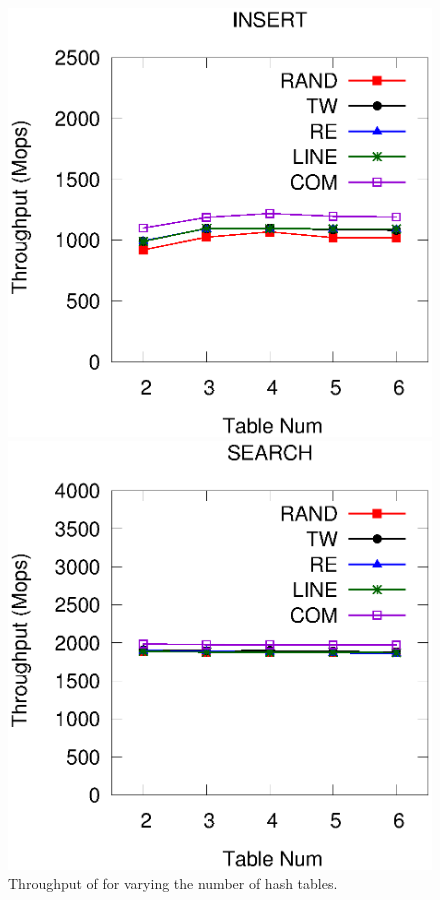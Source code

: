 \begin{figure}[t]
	\begin{minipage}{0.48\linewidth}\centering
		\includegraphics[width=\linewidth]{pic/tunning/tunning-insert.eps}
		\centerline{}
	\end{minipage}
	\hfill
	\begin{minipage}{0.48\linewidth}\centering
		\includegraphics[width=\linewidth]{pic/tunning/tunning-search.eps}
		\centerline{}
	\end{minipage}
	\caption{Throughput of \voter for varying the number of hash tables.}
	\label{fig:vary-table}
\end{figure}
